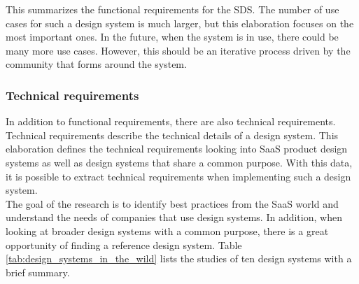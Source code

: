 This summarizes the functional requirements for the SDS. The number of use cases for such a design system is much larger, but this elaboration focuses on the most important ones. In the future, when the system is in use, there could be many more use cases. However, this should be an iterative process driven by the community that forms around the system.

\subsubsection{Technical requirements}
In addition to functional requirements, there are also technical requirements. Technical requirements describe the technical details of a design system. This elaboration defines the technical requirements looking into SaaS product design systems as well as design systems that share a common purpose. With this data, it is possible to extract technical requirements when implementing such a design system.\\
The goal of the research is to identify best practices from the SaaS world and understand the needs of companies that use design systems. In addition, when looking at broader design systems with a common purpose, there is a great opportunity of finding a reference design system. Table \ref{tab:design_systems_in_the_wild} lists the studies of ten design systems with a brief summary.
